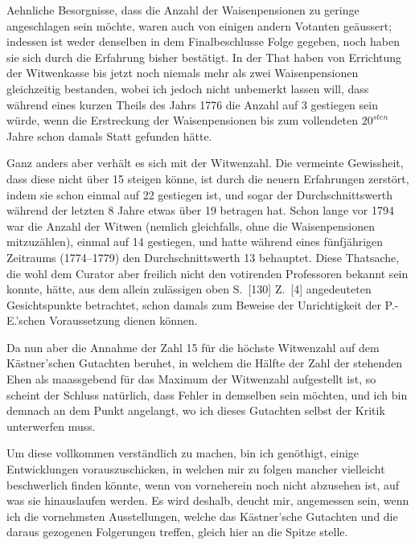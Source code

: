 \documentclass[12pt,a4paper]{article}
\begin{document}
Aehnliche Besorgnisse, dass die Anzahl der Waisenpensionen zu geringe angeschlagen sein m\"ochte, waren auch von einigen andern Votanten ge\"aussert; indessen ist weder denselben in dem Finalbeschlusse Folge gegeben, noch haben sie sich durch die Erfahrung bisher best\"atigt. In der That haben von Errichtung der Witwenkasse bis jetzt noch niemals mehr als zwei Waisenpensionen gleichzeitig bestanden, wobei ich jedoch nicht unbemerkt lassen will, dass w\"ahrend eines kurzen Theils des Jahrs 1776 die Anzahl auf 3 gestiegen sein w\"urde, wenn die Erstreckung der Waisenpensionen bis zum vollendeten $20^{sten}$ Jahre schon damals Statt gefunden h\"atte.

Ganz anders aber verh\"alt es sich mit der Witwenzahl. Die vermeinte Gewissheit, dass diese nicht \"uber 15 steigen k\"onne, ist durch die neuern Erfahrungen zerst\"ort, indem sie schon einmal auf 22 gestiegen ist, und sogar der Durchschnittswerth w\"ahrend der letzten 8 Jahre etwas \"uber 19 betragen hat. Schon lange vor 1794 war die Anzahl der Witwen (nemlich gleichfalls, ohne die Waisenpensionen mitzuz\"ahlen), einmal auf 14 gestiegen, und hatte w\"ahrend eines f\"unfj\"ahrigen Zeitraums (1774--1779) den Durchschnittswerth 13 behauptet. Diese Thatsache, die wohl dem Curator aber freilich nicht den votirenden Professoren bekannt sein konnte, h\"atte, aus dem allein zul\"assigen oben S.\ [130] Z.\ [4] angedeuteten Gesichtspunkte betrachtet, schon damals zum Beweise der Unrichtigkeit der P.-E.'schen Voraussetzung dienen k\"onnen.

Da nun aber die Annahme der Zahl 15 f\"ur die h\"ochste Witwenzahl auf dem K\"astner'schen Gutachten beruhet, in welchem die H\"alfte der Zahl der stehenden Ehen als maassgebend f\"ur das Maximum der Witwenzahl aufgestellt ist, so scheint der Schluss nat\"urlich, dass Fehler in demselben sein m\"ochten, und ich bin demnach an dem Punkt angelangt, wo ich dieses Gutachten selbst der Kritik unterwerfen muss.

Um diese vollkommen verst\"andlich zu machen, bin ich gen\"othigt, einige Entwicklungen vorauszuschicken, in welchen mir zu folgen mancher vielleicht beschwerlich finden k\"onnte, wenn von vorneherein noch nicht abzusehen ist, auf was sie hinauslaufen werden. Es wird deshalb, deucht mir, angemessen sein, wenn ich die vornehmsten Ausstellungen, welche das K\"astner'sche Gutachten und die daraus gezogenen Folgerungen treffen, gleich hier an die Spitze stelle.
\end{document}
